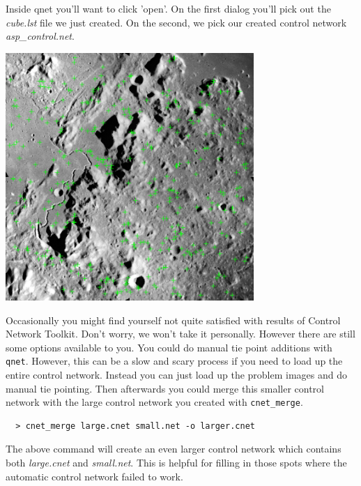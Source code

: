 Inside qnet you'll want to click 'open'. On the first dialog you'll
pick out the \emph{cube.lst} file we just created. On the second, we
pick our created control network \emph{asp\_control.net}.

\begin{center}
\includegraphics[height=3.7in]{images/cnettk_qnet_screen_400px.png}
\end{center}

Occasionally you might find yourself not quite satisfied with results
of Control Network Toolkit. Don't worry, we won't take it
personally. However there are still some options available to you. You
could do manual tie point additions with \texttt{qnet}. However, this
can be a slow and scary process if you need to load up the entire
control network. Instead you can just load up the problem images and
do manual tie pointing. Then afterwards you could merge this smaller
control network with the large control network you created with
\texttt{cnet\_merge}.

\begin{verbatim}
  > cnet_merge large.cnet small.net -o larger.cnet
\end{verbatim}

The above command will create an even larger control network which
contains both \emph{large.cnet} and \emph{small.net}. This is helpful
for filling in those spots where the automatic control network failed
to work.
